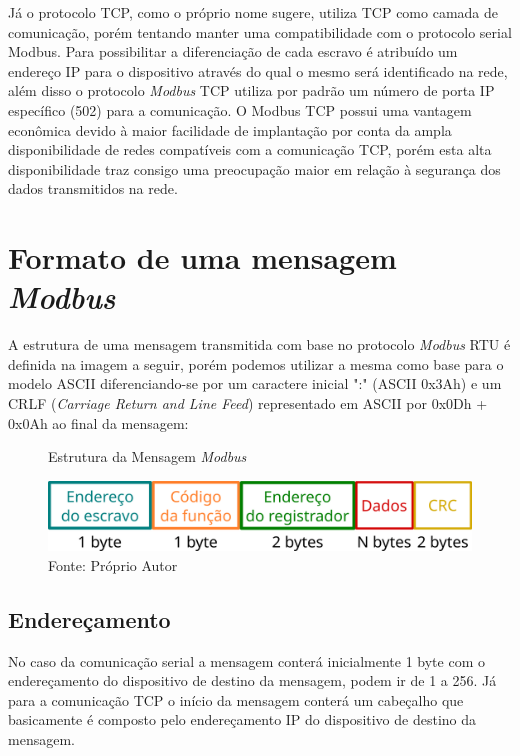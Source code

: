 Já o protocolo TCP, como o próprio nome sugere, utiliza TCP como camada de comunicação, porém tentando manter uma compatibilidade com o protocolo serial Modbus. Para possibilitar a diferenciação de cada escravo é atribuído um endereço IP para o dispositivo através do qual o mesmo será identificado na rede, além disso o protocolo \textit{Modbus} TCP utiliza por padrão um número de porta IP específico (502) para a comunicação. O Modbus TCP possui uma vantagem econômica devido à maior facilidade de implantação por conta da ampla disponibilidade de redes compatíveis com a comunicação TCP, porém esta alta disponibilidade traz consigo uma preocupação maior em relação à segurança dos dados transmitidos na rede. 


\section{Formato de uma mensagem \textit{Modbus}}

A estrutura de uma mensagem transmitida com base 
no protocolo \textit{Modbus} RTU é definida 
na imagem a seguir, porém podemos utilizar a mesma 
como base para o modelo ASCII 
diferenciando-se por um caractere inicial ":" (ASCII 0x3Ah) 
e um CRLF (\textit{Carriage Return and Line Feed}) 
representado em ASCII por 0x0Dh + 0x0Ah ao final da mensagem:
\newline

\begin{figure}[h]
\caption{Estrutura da Mensagem \textit{Modbus}}
\centering
\includegraphics[width=1.0\textwidth,height=1.0\textheight,keepaspectratio]{imagens/mensagem-modbus.png}
\caption*{Fonte: Próprio Autor}
\end{figure}

\subsection{Endereçamento}

No caso da comunicação serial a mensagem conterá inicialmente 1 byte com o endereçamento do dispositivo de destino da mensagem, podem ir de 1 a 256. Já para a comunicação TCP o início da mensagem conterá um cabeçalho que basicamente é composto pelo endereçamento IP do dispositivo de destino da mensagem.

